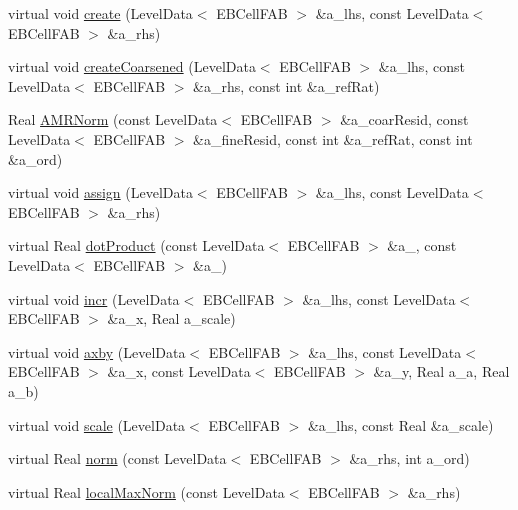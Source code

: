 \begin{DoxyCompactItemize}
\item 
virtual void \hyperlink{classnwoebconductivityop_a1756d1bb5ced88c69c2e336737714c76}{create} (Level\+Data$<$ E\+B\+Cell\+F\+AB $>$ \&a\+\_\+lhs, const Level\+Data$<$ E\+B\+Cell\+F\+AB $>$ \&a\+\_\+rhs)
\item 
virtual void \hyperlink{classnwoebconductivityop_a640798545f6ab155a7479f19436f0900}{create\+Coarsened} (Level\+Data$<$ E\+B\+Cell\+F\+AB $>$ \&a\+\_\+lhs, const Level\+Data$<$ E\+B\+Cell\+F\+AB $>$ \&a\+\_\+rhs, const int \&a\+\_\+ref\+Rat)
\item 
Real \hyperlink{classnwoebconductivityop_a8025d1b7b7fd9cc225c2c1606a1ac5d0}{A\+M\+R\+Norm} (const Level\+Data$<$ E\+B\+Cell\+F\+AB $>$ \&a\+\_\+coar\+Resid, const Level\+Data$<$ E\+B\+Cell\+F\+AB $>$ \&a\+\_\+fine\+Resid, const int \&a\+\_\+ref\+Rat, const int \&a\+\_\+ord)
\item 
virtual void \hyperlink{classnwoebconductivityop_abb7cd5c35e111567e7237b4b5332dd99}{assign} (Level\+Data$<$ E\+B\+Cell\+F\+AB $>$ \&a\+\_\+lhs, const Level\+Data$<$ E\+B\+Cell\+F\+AB $>$ \&a\+\_\+rhs)
\item 
virtual Real \hyperlink{classnwoebconductivityop_a26b88ccf2efe80ad2f1bd9329b1c3d4f}{dot\+Product} (const Level\+Data$<$ E\+B\+Cell\+F\+AB $>$ \&a\+\_, const Level\+Data$<$ E\+B\+Cell\+F\+AB $>$ \&a\+\_)
\item 
virtual void \hyperlink{classnwoebconductivityop_a1346e2accb55e5a32bdab09e9a7ca86c}{incr} (Level\+Data$<$ E\+B\+Cell\+F\+AB $>$ \&a\+\_\+lhs, const Level\+Data$<$ E\+B\+Cell\+F\+AB $>$ \&a\+\_\+x, Real a\+\_\+scale)
\item 
virtual void \hyperlink{classnwoebconductivityop_a4b2d9c516b268571a6f941312903f4d4}{axby} (Level\+Data$<$ E\+B\+Cell\+F\+AB $>$ \&a\+\_\+lhs, const Level\+Data$<$ E\+B\+Cell\+F\+AB $>$ \&a\+\_\+x, const Level\+Data$<$ E\+B\+Cell\+F\+AB $>$ \&a\+\_\+y, Real a\+\_\+a, Real a\+\_\+b)
\item 
virtual void \hyperlink{classnwoebconductivityop_ad9c114999bbb704214b9dfee61443b51}{scale} (Level\+Data$<$ E\+B\+Cell\+F\+AB $>$ \&a\+\_\+lhs, const Real \&a\+\_\+scale)
\item 
virtual Real \hyperlink{classnwoebconductivityop_a706802f129e5afdb86f581a92fa4d064}{norm} (const Level\+Data$<$ E\+B\+Cell\+F\+AB $>$ \&a\+\_\+rhs, int a\+\_\+ord)
\item 
virtual Real \hyperlink{classnwoebconductivityop_ab220a5086cb35e9645acbc2e35424997}{local\+Max\+Norm} (const Level\+Data$<$ E\+B\+Cell\+F\+AB $>$ \&a\+\_\+rhs)
\item 

\end{DoxyCompactItemize}
